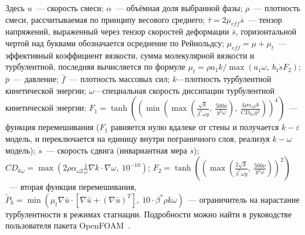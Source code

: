 \documentclass[mathematics,article,accept,pdftex,moreauthors]{Definitions/mdpi}
\begin{document}
Здесь ${u}$~--- скорость смеси; $\alpha$~--- объёмная доля выбранной фазы; $\rho$~--- плотность смеси, рассчитываемая по принципу весового среднего; $\bar{ {\tau}} = 2 \mu_{eff} \bar{ {s}}$~--- тензор напряжений, выраженный через тензор скоростей деформации $\bar{ {s}}$, горизонтальной чертой над буквами обозначается осреднение по Рейнольдсу; $\mu_{eff} = \mu + \mu_t$~--- эффективный коэффициент вязкости, сумма молекулярной вязкости и турбулентной, последняя вычисляется по формуле $\mu_t = \rho a_1 k / \max(a_1 \omega,\ b_1 \dot{s} F_2)$; $\bar{p}$~--- давление; $\bar{ {f}}$~--- плотность массовых сил; $k$---плотность турбулентной кинетической энергии; $\omega$---специальная скорость диссипации турбулентной кинетической энергии; $F_1 = \tanh \left( \left( \min\left( \max \left( \frac{\sqrt{k}}{\beta^* \omega y},\ \frac{500 \nu}{y^2 \omega} \right),\ \frac{4 \rho \alpha_{\omega 2} k}{CD_{k \omega} y^2} \right) \right)^4 \right)$~--- функция перемешивания ($F_1$ равняется нулю вдалеке от стены и получается $k-\varepsilon$ модель, и переключается на единицу внутри пограничного слоя, реализуя $k-\omega$ модель); $\dot{s}$~--- скорость сдвига (инвариантная мера $\overline{ {s}}$);  $CD_{k\omega} = \max \left( 2 \rho \alpha_{\omega 2} \frac{1}{\omega}  {\nabla} k \cdot  {\nabla} \omega,\ 10^{-10} \right)$; $F_2 = \tanh \left( \left( \max \left( \frac{2 \sqrt{k}}{\beta^* \omega y},\ \frac{500 \nu}{y^2 \omega} \right) \right)^2 \right)$~--- вторая функция перемешивания, $\widetilde{P}_k = \min (\mu_t  {\nabla} \bar{ {u}} \cdot \left[  {\nabla} \bar{ {u}} + ( {\nabla} \bar{ {u}})^T\right],\ 10 \cdot \beta^* \rho k \omega)$~--- ограничитель на нарастание турбулентности в режимах стагнации. Подробности можно найти в руководстве пользователя пакета OpenFOAM~\cite{OFUG}.
\end{document}
